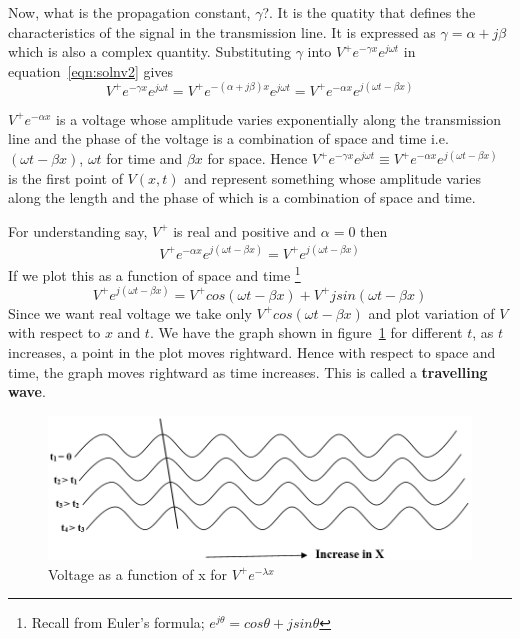 Now, what is the propagation constant, $\gamma$?. It is the quatity that defines the characteristics of the signal in the transmission line. It is expressed as $ \gamma = \alpha + j\beta $	 which is also a complex quantity. Substituting $\gamma$ into $V^{+}e^{- \gamma x}e^{j \omega t}$ in equation~\eqref{eqn:solnv2} gives
\begin{dmath}
V^{+}e^{- \gamma x}e^{j \omega t} = V^{+}e^{-( \alpha + j \beta )x}e^{j \omega t} = V^{+}e^{-\alpha x}e^{j(\omega t - \beta x)}
\end{dmath}

$ V^{+}e^{-\alpha x} $ is a voltage whose amplitude varies exponentially along the transmission line and the phase of the voltage is a combination of space and time i.e. $  (\omega t- \beta x) $, $ \omega t $ for time and $ \beta x  $ for space. Hence $ V^{+}e^{-\gamma x}e^{j\omega t} \equiv V^{+}e^{-\alpha x}e^{j( \omega t-\beta x)} $ is the first point of $V(x,t)$ and represent something whose amplitude varies along the length and the phase of which is a combination of space and time.

For understanding say, $  V^{+} $ is real and positive and $ \alpha= 0 $ then
\begin{align*}
V^{+}e^{-\alpha x}e^{j( \omega t-\beta x)} = V^{+} e^{j( \omega t-\beta x)}
\end{align*}
If we plot this as a function of space and time
\footnote{Recall from Euler's formula; $ e^{j\theta} = cos\theta + jsin\theta $}
\begin{equation*}
V^{+}e^{j( \omega t-\beta x)} = V^{+}cos(\omega t- \beta x) +  V^{+}jsin(\omega t- \beta x)
\end{equation*}
Since we want real voltage we take only $ V^{+}cos(\omega t- \beta x) $ and plot variation of $ V $ with respect to $ x $ and $ t $. We have the graph shown in figure~\ref{fig:abc} for different $ t $, as $ t $ increases, a point in the plot moves rightward. Hence with respect to space and time, the graph moves rightward as time increases. This is called a \textbf{travelling wave}.
\begin{figure}[h]
\centering
\includegraphics[width=1\linewidth]{graphics/ABC}
\caption{Voltage as a function of x for $V^+e^{-\lambda x}$}
\label{fig:abc}
\end{figure}

